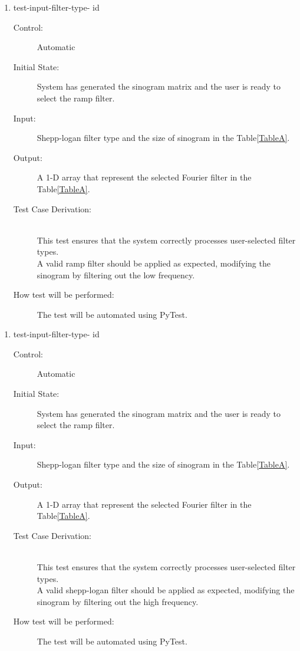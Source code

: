\documentclass[12pt, titlepage]{article}
\newcounter{testnum}
\newcommand{\dthetestnum}{id\thetestnum}
\begin{document}
\begin{enumerate}
\item{test-input-filter-type- \label{id2} \dthetestnum}
\begin{description}
\item[Control:] Automatic

\item[Initial State:] System has generated the sinogram matrix and the user is
  ready to select the ramp filter.

\item[Input:] Shepp-logan filter type and the size of sinogram in the Table\ref{TableA}.

\item[Output:] A 1-D array that represent the selected Fourier filter in the Table\ref{TableA}.

\item[Test Case Derivation:] \hfill \\
  This test ensures that the system correctly processes
  user-selected filter types.\\
  A valid ramp filter should be applied as expected, modifying the sinogram
  by filtering out the low frequency.

\item[How test will be performed:] The test will be automated using PyTest.
\end{description}
\end{enumerate}

\begin{enumerate}
\item{test-input-filter-type- \label{id3} \dthetestnum}
\begin{description}
\item[Control:] Automatic


\item[Initial State:] System has generated the sinogram matrix and the user is
  ready to select the ramp filter.

\item[Input:] Shepp-logan filter type and the size of sinogram in the Table\ref{TableA}.

\item[Output:] A 1-D array that represent the selected Fourier filter in the Table\ref{TableA}.

\item[Test Case Derivation:] \hfill \\
  This test ensures that the system correctly processes
  user-selected filter types.\\
  A valid shepp-logan filter should be applied as expected, modifying the
  sinogram by filtering out the high frequency.

\item[How test will be performed:] The test will be automated using PyTest.
\end{description}
\end{enumerate}
\end{document}
